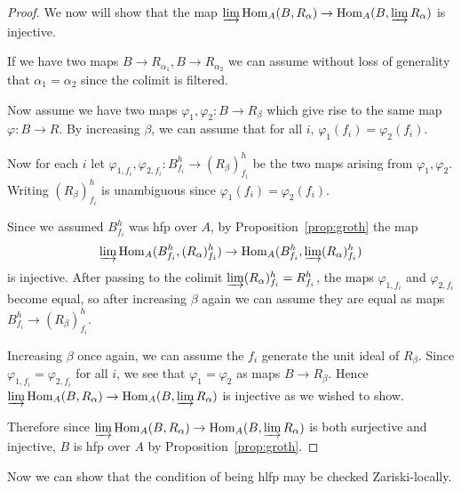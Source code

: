 \documentclass[12pt]{article}
\newcommand{\Hom}{{\rm Hom}}
\newcommand{\colim}{\varinjlim}
\newcommand{\vp}{\varphi}
\newcommand{\hlfp}{hlfp\xspace}
\newcommand{\hfp}{hfp\xspace}
\theoremstyle{definition}
\numberwithin{equation}{subsection}
\begin{document}
\begin{proof}
We now will show that the map $\colim \Hom_A(B,R_\alpha) \to \Hom_A(B,\colim R_\alpha)$ is injective. 

If we have two maps $B \to R_{\alpha_1}, B \to R_{\alpha_2}$ we can assume without loss of generality that $\alpha_1=\alpha_2$ since the colimit is filtered. 

Now assume we have two maps $\vp_1,\vp_2: B \to R_{\beta}$ which give rise to the same map $\vp: B \to R$. By increasing $\beta$, we can assume that for all $i$, $\vp_1(f_i)=\vp_2(f_i)$.

Now for each $i$ let $\vp_{1,f_i},\vp_{2,f_i}: B_{f_i}^h \to (R_{\beta})_{f_i}^h$ be the two maps arising from $\vp_1,\vp_2$. Writing $(R_{\beta})_{f_i}^h$ is unambiguous since $\vp_1(f_i)=\vp_2(f_i)$.

Since we assumed $B_{f_i}^h$ was \hfp over $A$, by Proposition~\ref{prop:groth} the map  $$\colim \Hom_A(B_{f_i}^h,(R_\alpha)_{f_i}^h) \to \Hom_A(B_{f_i}^h,\colim (R_\alpha)_{f_i}^h)$$ is injective. After passing to the colimit $\colim (R_\alpha)_{f_i}^h=R_{f_i}^h$, the maps $\vp_{1,f_i}$ and $\vp_{2,f_i}$ become equal, so after increasing $\beta$ again we can assume they are equal as maps $B_{f_i}^h \to (R_{\beta})_{f_i}^h$. 

Increasing $\beta$ once again, we can assume the $f_i$ generate the unit ideal of $R_\beta$. Since $\vp_{1,f_i}=\vp_{2,f_i}$ for all $i$, we see that $\vp_1=\vp_2$ as maps $B \to R_\beta$. Hence $\colim \Hom_A(B,R_\alpha) \to \Hom_A(B,\colim R_\alpha)$ is injective as we wished to show. 


Therefore since $\colim \Hom_A(B,R_\alpha) \to \Hom_A(B,\colim R_\alpha)$ is both surjective and injective, $B$ is \hfp over $A$ by Proposition~\ref{prop:groth}. \end{proof}


Now we can show that the condition of being \hlfp may be checked Zariski-locally.
\end{document}

